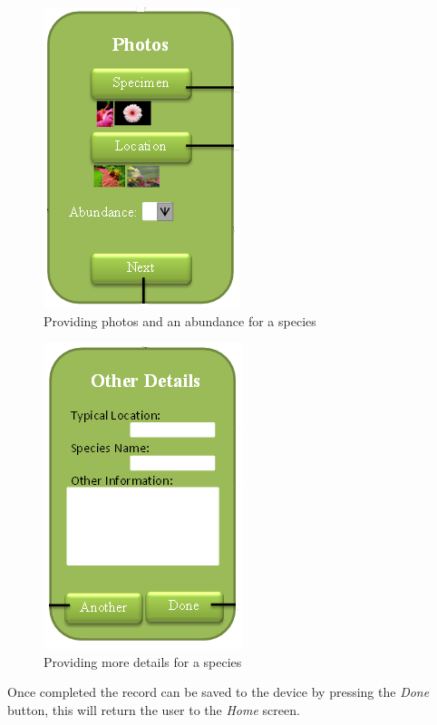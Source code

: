 \documentclass[12pt]{article}
\begin{document}
		\begin{figure}[H]
			\begin{center}
				\includegraphics[scale=0.7]{app-Photos}
			\end{center}
			\caption{Providing photos and an abundance for a species}
			\label{fig:app-photos}
		\end{figure}

		\begin{figure}[H]
			\begin{center}
				\includegraphics[scale=0.7]{app-OtherDetails}
			\end{center}
			\caption{Providing more details for a species}
			\label{fig:app-specdetailsentry}
		\end{figure}		

		Once completed the record can be saved to the device by pressing the \textit{Done} button, this will return the user to the \textit{Home} screen.
\end{document}
